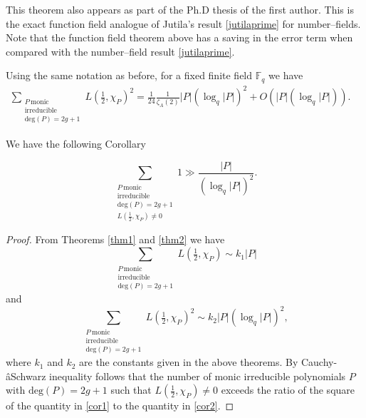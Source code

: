 \documentclass[11pt]{amsart}
\begin{document}
This theorem also appears as part of the Ph.D thesis \cite{And} of the first author. This is the exact function field analogue of Jutila's result \eqref{jutilaprime} for number--fields. Note that the function field theorem above has a saving in the error term when compared with the number--field result \eqref{jutilaprime}. 

\begin{thm}
\label{thm2}
Using the same notation as before, for a fixed finite field $\mathbb{F}_{q}$ we have
\begin{multline}
\sum_{\substack{P \ \mathrm{monic} \\ \mathrm{irreducible} \\ \mathrm{deg}(P)=2g+1}}L(\tfrac{1}{2},\chi_{P})^{2}=\frac{1}{24}\frac{1}{\zeta_{A}(2)}|P|(\log_{q}|P|)^{2}+O(|P|(\log_{q}|P|)).\ \ \ \ \ \ \ \ \ \ \ \ \ \ \ \ \ \ \ \ \ \ \ \ \ \ \ \ \ \ \ \ \ \ 
\end{multline}
\end{thm}

We have the following Corollary

\begin{cor}
\begin{equation}
\sum_{\substack{P \ \mathrm{monic} \\ \mathrm{irreducible} \\ \mathrm{deg}(P)=2g+1 \\ L(\tfrac{1}{2},\chi_{P})\neq0}}1\gg\frac{|P|}{(\log_{q}|P|)^{2}}.
\end{equation}
\end{cor}
\begin{proof}
From Theorems \ref{thm1} and \ref{thm2} we have
\begin{equation}
\label{cor1}
\sum_{\substack{P \ \mathrm{monic} \\ \mathrm{irreducible} \\ \mathrm{deg}(P)=2g+1}}L(\tfrac{1}{2},\chi_{P})\sim k_{1}|P|
\end{equation}
and
\begin{equation}
\label{cor2}
\sum_{\substack{P \ \mathrm{monic} \\ \mathrm{irreducible} \\ \mathrm{deg}(P)=2g+1}}L(\tfrac{1}{2},\chi_{P})^{2}\sim k_{2}|P|(\log_{q}|P|)^{2},
\end{equation}
where $k_{1}$ and $k_{2}$ are the constants given in the above theorems. By Cauchy-âSchwarz inequality follows that the number of monic irreducible polynomials $P$ with $\mathrm{deg}(P)=2g+1$ such that $L(\tfrac{1}{2},\chi_{P})\neq0$ exceeds the ratio of the square of the quantity in \eqref{cor1} to the quantity in \eqref{cor2}.
\end{proof}
\end{document}
